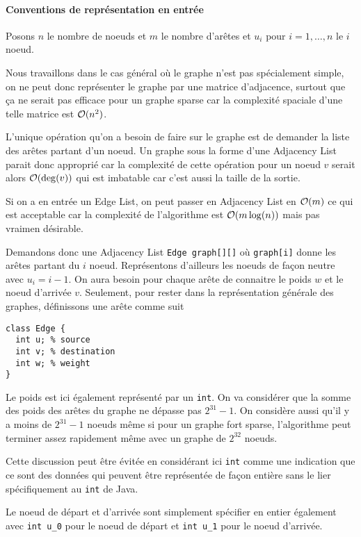 \paragraph{Conventions de représentation en entrée}
Posons $n$ le nombre de noeuds et $m$ le nombre d'arêtes et $u_i$ pour $i = 1, \ldots, n$ le $i$\ieme{} noeud.

Nous travaillons dans le cas général où le graphe n'est pas spécialement simple,
on ne peut donc représenter le graphe par une matrice d'adjacence, surtout que ça ne serait pas efficace pour un graphe sparse car la complexité spaciale d'une telle matrice est $\mathcal{O}(n^2)$.

L'unique opération qu'on a besoin de faire sur le graphe est de demander la liste des arêtes partant d'un noeud.
Un graphe sous la forme d'une Adjacency List parait donc approprié car la complexité de cette opération pour un noeud $v$ serait alors $\mathcal{O}(\deg(v))$ qui est imbatable car c'est aussi la taille de la sortie.

Si on a en entrée un Edge List, on peut passer en Adjacency List en $\mathcal{O}(m)$ ce qui est acceptable car la complexité de l'algorithme est $\mathcal{O}(m\log(n))$ mais pas vraimen désirable.

Demandons donc une Adjacency List \lstinline|Edge graph[][]|
où \lstinline|graph[i]| donne les arêtes partant du $i$\ieme{} noeud.
Représentons d'ailleurs les noeuds de façon neutre avec $u_i = i-1$.
On aura besoin pour chaque arête de connaitre le poids $w$ et le noeud d'arrivée $v$.
Seulement, pour rester dans la représentation générale des graphes,
définissons une arête comme suit
\begin{lstlisting}
class Edge {
  int u; % source
  int v; % destination
  int w; % weight
}
\end{lstlisting}
Le poids est ici également représenté par un \lstinline|int|.
On va considérer que la somme des poids des arêtes du graphe ne dépasse pas $2^{31}-1$.
On considère aussi qu'il y a moins de $2^{31}-1$ noeuds même si pour un graphe fort sparse, l'algorithme peut terminer assez rapidement même avec un graphe de $2^{32}$ noeuds.

Cette discussion peut être évitée en considérant ici \lstinline|int| comme une indication que ce sont des données qui peuvent être représentée de façon entière sans le lier spécifiquement au \lstinline|int| de Java.

Le noeud de départ et d'arrivée sont simplement spécifier en entier
également avec \lstinline|int u_0| pour le noeud de départ
et \lstinline|int u_1| pour le noeud d'arrivée.

